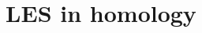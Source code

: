 \documentclass{ximera}
\title{LES in homology}
\begin{document}
\begin{abstract}

\end{abstract}
\maketitle

\end{document}
